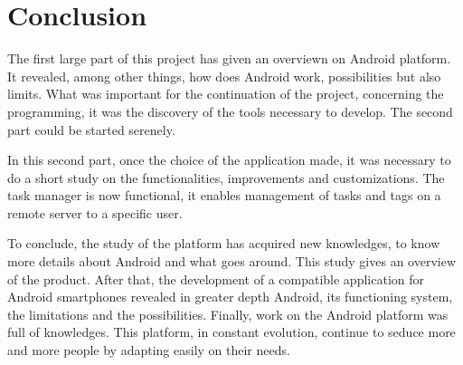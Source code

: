 \chapter{Conclusion}

\vspace{2cm}

\noindent The first large part of this project has given an overviewn on Android platform. It revealed, among other things, how does Android work, possibilities but also limits. What was important for the continuation of the project, concerning the programming, it was the discovery of the tools necessary to develop. The second part could be started serenely.

\noindent In this second part, once the choice of the application made, it was necessary to do a short study on the functionalities, improvements and customizations. The task manager is now functional, it enables management of tasks and tags on a remote server to a specific user.

\noindent To conclude, the study of the platform has acquired new knowledges, to know more details about Android and what goes around. This study gives an overview of the product.
After that, the development of a compatible application for Android smartphones revealed in greater depth Android, its functioning system, the limitations and the possibilities.
Finally, work on the Android platform was full of knowledges. This platform, in constant evolution, continue to seduce more and more people by adapting easily on their needs.


\clearpage
